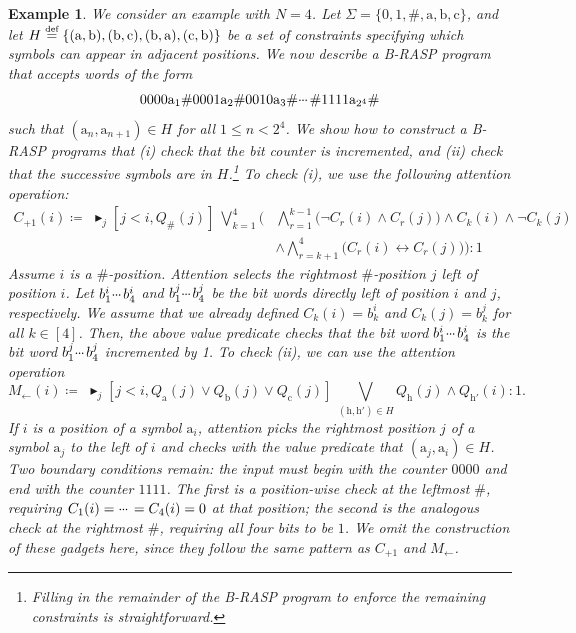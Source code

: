 \documentclass{article} %
\newtheorem{example}{Example}
\newcommand{\maxatt}{\blacktriangleright}
\newcommand{\defeq}{\mathrel{\stackrel{\textnormal{\tiny def}}{=}}}
\newcommand{\bnfdef}{\coloneqq}
\newcommand{\sym}[1]{\mathrm{#1}}
\newcommand{\alphabet}{\Sigma}
\newcommand{\mydots}{%
  \ifmmode
    \mathord{.}\mkern-1mu\mathord{.}\mkern-1mu\mathord{.}%
  \else
    .\kern-0.1em.\kern-0.1em.%
  \fi
}
\newcommand{\mycdots}{%
  \ifmmode
    \mathord{\raisebox{0.45ex}{\ensuremath{\mydots}}}\mkern2mu%
  \else
    \raisebox{0.45ex}{.\kern-0.1em.\kern-0.1em.}\kern0.1em%
  \fi
}
\renewcommand{\cdots}{\mycdots}%
\begin{document}
\begin{example}\label{ex:tiling}
We consider an example with $N=4$.
Let $\alphabet = \{\sym{0}, \sym{1}, \sym{\#}, \sym{a},\sym{b},\sym{c}\}$, and let $H \defeq \{(\sym{a},\sym{b}),(\sym{b},\sym{c}),(\sym{b},\sym{a}),(\sym{c},\sym{b})\}$ be a set of constraints specifying which symbols can appear in adjacent positions.
We now describe a B-RASP program that accepts words of the form
\[\sym{0000a_1 \# 0001a_2 \# 0010a_3 \#} \cdots \sym{\# 1111a_{2^4} \#}\]
such that $(\sym{a}_n,\sym{a}_{n+1}) \in H$ for all $1 \le n < 2^4$.
We show how to construct a B-RASP programs that (i) check that the bit counter is incremented, and
(ii) check that the successive symbols are in $H$.\footnote{Filling in the remainder of the B-RASP program to enforce the remaining constraints is straightforward.}
To check (i), we use the following attention operation:
\begin{equation}\label{eq:increment-predic}
\begin{split}
C_{+1}(i) \bnfdef\,\, \maxatt_j[j<i,Q_\#(j)]\ \bigvee_{k=1}^4 \Biggl(&\bigwedge_{r=1}^{k-1} \big(\neg C_r(i) \wedge C_r(j)\big) \wedge C_k(i) \wedge \neg C_k(j) \\
&\wedge \bigwedge_{r=k+1}^{4} \big(C_r(i) \leftrightarrow C_r(j)\big) \Biggr) \colon 1
\end{split}
\end{equation}
Assume $i$ is a $\#$-position.
Attention selects the rightmost $\#$-position $j$ left of position $i$.
Let $b_1^i \cdots b_4^i$ and $b_1^j \cdots b_4^j$ be the bit words directly left of position $i$ and $j$, respectively.
We assume that we already defined $C_k(i) = b_k^i$ and $C_k(j) = b_k^j$ for all $k \in [4]$.
Then, the above value predicate checks that the bit word $b_1^i \cdots b_4^i$ is the bit word $b_1^j \cdots b_4^j$ incremented by 1.
To check (ii), we can use the attention operation
\begin{equation}
M_{\leftarrow}(i) \bnfdef \,\, \maxatt_j[j<i,Q_{\sym{a}}(j) \vee Q_{\sym{b}}(j) \vee Q_{\sym{c}}(j)]\ \bigvee_{(\sym{h},\sym{h}') \in H} Q_{\sym{h}}(j) \wedge Q_{\sym{h}'}(i) : 1.
\end{equation}
If $i$ is a position of a symbol $\sym{a}_i$, attention picks the rightmost position $j$ of a symbol $\sym{a}_j$ to the left of $i$ and
checks with the value predicate that $(\sym{a}_j,\sym{a}_i) \in H$.
Two boundary conditions remain: the input must begin with the counter $\sym{0000}$ and end with the counter $\sym{1111}$.
The first is a position-wise check at the leftmost $\sym{\#}$, requiring $C_1(i) = \cdots = C_4(i) = 0$ at that position; the second is the analogous check at the rightmost $\sym{\#}$, requiring all four bits to be $1$.
We omit the construction of these gadgets here, since they follow the same pattern as $C_{+1}$ and $M_\leftarrow$.
\end{example}
\end{document}
